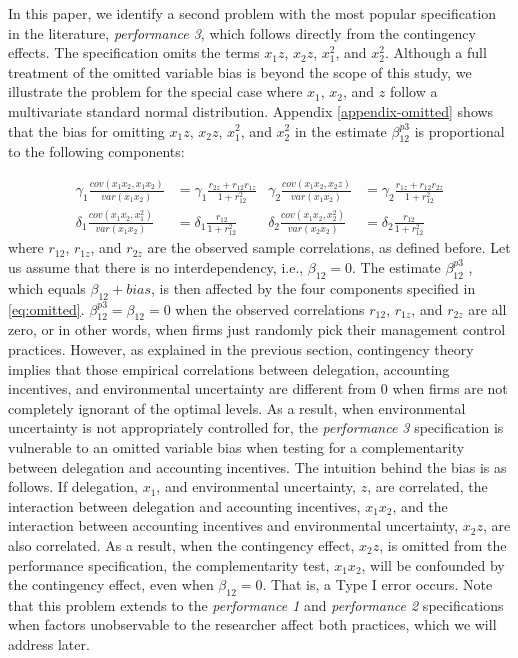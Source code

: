 \documentclass[12pt]{article}
\begin{document}
In this paper, we identify a second problem with the most popular specification in the literature, \emph{performance 3}, which follows directly from the contingency effects. The specification omits the terms $x_1 z$, $x_2 z$, $x_1^2$, and $x_2^2$. Although a full treatment of the omitted variable bias is beyond the scope of this study, we illustrate the problem for the special case where $x_1$, $x_2$, and $z$ follow a multivariate standard normal distribution. Appendix \ref{appendix-omitted} shows that the bias for omitting $x_1 z$, $x_2 z$, $x_1^2$, and $x_2^2$ in the estimate $\beta^{p3}_{12}$ is proportional to the following components:

\begin{equation}\label{eq:omitted}
\begin{aligned}
\gamma_1 \frac{cov(x_1 x_2, x_1 x_2)}{var(x_1 x_2)} &= 
\gamma_1 \frac{r_{2z} + r_{12} r_{1z}}{1 + r_{12}^2}
&\gamma_2 \frac{cov(x_1 x_2, x_2 z)}{var(x_1 x_2)} &= 
\gamma_2 \frac{r_{1z} + r_{12} r_{2z}}{1 + r_{12}^2}
\\
\delta_1 \frac{cov(x_1 x_2, x_1^2)}{var(x_1 x_2)} &= 
\delta_1 \frac{r_{12}}{1 + r_{12}^2}
&\delta_2 \frac{cov(x_1 x_2, x_2^2)}{var(x_2 x_2)} &= 
\delta_2 \frac{r_{12}}{1 + r_{12}^2}
\end{aligned}
\end{equation}
where $r_{12}$, $r_{1z}$, and $r_{2z}$ are the observed sample correlations, as defined before. Let us assume that there is no interdependency, i.e., $\beta_{12}=0$. The estimate $\beta^{p3}_{12}$ , which equals $\beta_{12} + bias$, is then affected by the four components specified in \eqref{eq:omitted}. $\beta^{p3}_{12}=\beta_{12}=0$ when the observed correlations $r_{12}$, $r_{1z}$, and $r_{2z}$ are all zero, or in other words, when firms just randomly pick their management control practices. However, as explained in the previous section, contingency theory implies that those empirical correlations between delegation, accounting incentives, and environmental uncertainty are different from $0$ when firms are not completely ignorant of the optimal levels. As a result, when environmental uncertainty is not appropriately controlled for, the \emph{performance 3} specification is vulnerable to an omitted variable bias when testing for a complementarity between delegation and accounting incentives. The intuition behind the bias is as follows. If delegation, $x_1$, and environmental uncertainty, $z$, are correlated, the interaction between delegation and accounting incentives, $x_1 x_2$, and the interaction between accounting incentives and environmental uncertainty, $x_2 z$, are also correlated. As a result, when the contingency effect, $x_2 z$, is omitted from the performance specification, the complementarity test, $x_1 x_2$, will be confounded by the contingency effect, even when $\beta_{12}=0$. That is, a Type I error occurs. Note that this problem extends to the \emph{performance 1} and \emph{performance 2} specifications when factors unobservable to the researcher affect both practices, which we will address later.
\end{document}
